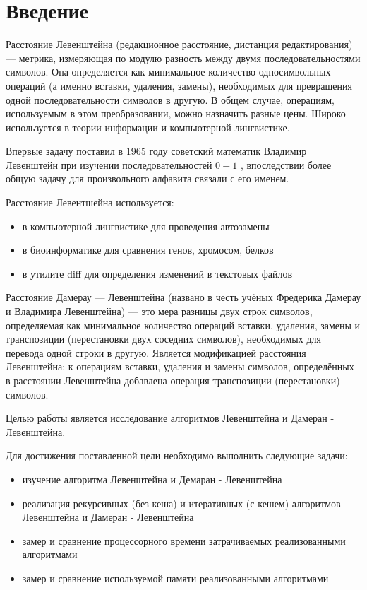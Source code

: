 \chapter*{Введение}

Расстояние Левенштейна (редакционное расстояние, дистанция редактирования) — метрика, измеряющая по модулю разность между двумя последовательностями символов. Она определяется как минимальное количество односимвольных операций (а именно вставки, удаления, замены), необходимых для превращения одной последовательности символов в другую. В общем случае, операциям, используемым в этом преобразовании, можно назначить разные цены. Широко используется в теории информации и компьютерной лингвистике.

Впервые задачу поставил в 1965 году советский математик Владимир Левенштейн при изучении последовательностей \(0 − 1\) \cite{leven1965}, впоследствии более общую задачу для произвольного алфавита связали с его именем.

Расстояние Левентшейна используется:

\begin{itemize}
    \item в компьютерной лингвистике для проведения автозамены
    \item в биоинформатике для сравнения генов, хромосом, белков
    \item в утилите diff для определения изменений в текстовых файлов
\end{itemize}

Расстояние Дамерау — Левенштейна (названо в честь учёных Фредерика Дамерау и Владимира Левенштейна) — это мера разницы двух строк символов, определяемая как минимальное количество операций вставки, удаления, замены и транспозиции (перестановки двух соседних символов), необходимых для перевода одной строки в другую. Является модификацией расстояния Левенштейна: к операциям вставки, удаления и замены символов, определённых в расстоянии Левенштейна добавлена операция транспозиции (перестановки) символов.

Целью работы является исследование алгоритмов Левенштейна и Дамеран - Левенштейна.

Для достижения поставленной цели необходимо выполнить следующие задачи:

\begin{itemize}
    \item изучение алгоритма Левенштейна и Демаран - Левенштейна
    \item реализация рекурсивных (без кеша) и итеративных (с кешем) алгоритмов Левенштейна и Дамеран - Левенштейна
    \item замер и сравнение процессорного времени затрачиваемых реализованными алгоритмами
    \item замер и сравнение используемой памяти реализованными алгоритмами
\end{itemize}